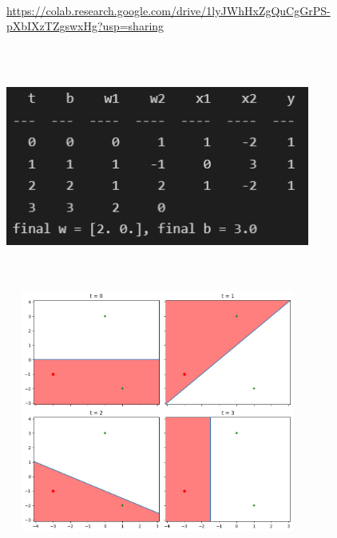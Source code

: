 \begin{solution}
  \\
  \url{https://colab.research.google.com/drive/1lyJWhHxZgQuCgGrPS-pXbIXzTZgswxHg?usp=sharing}
  \\
  \graphicspath{{images/}}
  \includegraphics[width=10cm, height=8cm]{Problem_4_A_Table.png}\\
  \includegraphics[width=10cm, height=8cm]{Problem_4_A.png}\\
\end{solution}


